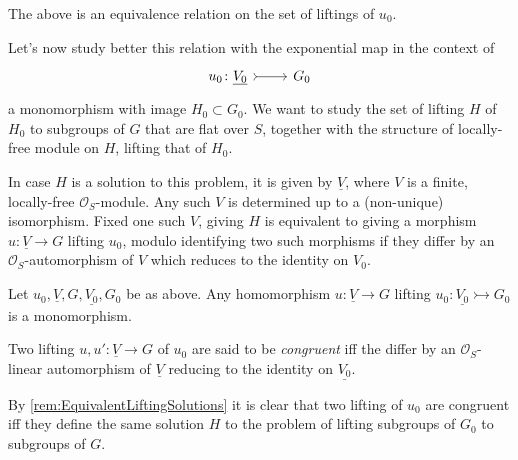 \documentclass[../Main]{subfiles}
\begin{document}
\begin{rem}[]
	The above is an equivalence relation on the set of liftings of $u_0$.
\end{rem}


\noindent
Let's now study better this relation with the exponential map in the context of
\begin{equation*}
\begin{tikzcd}[row sep = 0ex
	,/tikz/column 1/.append style={anchor=base east}
	,/tikz/column 2/.append style={anchor=base west}]
	u_0\colon \underline{V_0} \arrow[r, "", rightarrowtail] &
	G_0
\end{tikzcd}
\end{equation*} 
a monomorphism with image $H_0 \subset G_0$.
We want to study the set of lifting $H$ of $H_0$ to
subgroups of $G$ that are flat over $S$, together with the structure
of locally-free module on $H$, lifting that of $H_0$.


\begin{rem}\label{rem:EquivalentLiftingSolutions}
	In case $H$ is a solution to this problem, it is given by
	$\underline{V}$, where $V$ is a finite, locally-free $\mathcal{O}_{ S }$-module.
	Any such $V$ is determined up to a (non-unique) isomorphism.
	Fixed one such $V$, giving $H$ is equivalent to giving a morphism
	$u\colon \underline{V} \to G$ lifting $u_0$, modulo identifying
	two such morphisms if they differ by an $\mathcal{O}_{ S }$-automorphism
	of $V$ which reduces to the identity on $V_0$.
\end{rem}


\begin{lem}
	Let $u_0, \underline{V}, G, \underline{V_0}, G_0$ be as above.
	Any homomorphism $u\colon \underline{V} \to G$ lifting 
	$u_0\colon \underline{V_0} \rightarrowtail G_0$
	is a monomorphism.
\end{lem} 


\begin{defn}
	Two lifting $u, u'\colon \underline{V} \to G$ of $u_0$ are said to
	be {\em congruent} iff the differ by an $\mathcal{O}_{ S }$-linear
	automorphism of $\underline{V}$ reducing to the identity on $\underline{V_0}$.
\end{defn}


\begin{rem}[]
	By \cref{rem:EquivalentLiftingSolutions} it is clear that
	two lifting of $u_0$ are congruent iff they define the same solution
	$H$ to the problem of lifting subgroups of $G_0$ to subgroups of $G$.
\end{rem}
\end{document}
